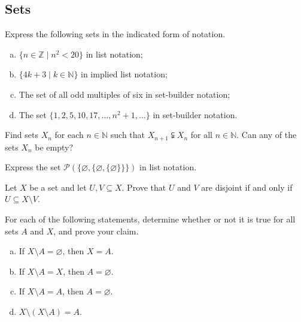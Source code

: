 \subsection*{Sets}

\begin{chapex}
Express the following sets in the indicated form of notation.
\begin{enumerate}[(a)]
\item $\{ n \in \mathbb{Z} \mid n^2 < 20 \}$ in list notation;
\item $\{ 4k+3 \mid k \in \mathbb{N} \}$ in implied list notation;
\item The set of all odd multiples of six in set-builder notation;
\item The set $\{ 1, 2, 5, 10, 17, \dots, n^2+1, \dots \}$ in set-builder notation.
\end{enumerate}
\end{chapex}

\begin{chapex}
Find sets $X_n$ for each $n \in \mathbb{N}$ such that $X_{n+1} \subsetneqq X_n$ for all $n \in \mathbb{N}$. Can any of the sets $X_n$ be empty?
\end{chapex}

\begin{chapex}
Express the set $\mathcal{P}(\{ \varnothing, \{ \varnothing, \{ \varnothing \} \} \})$ in list notation.
\end{chapex}

\begin{chapex}
Let $X$ be a set and let $U, V \subseteq X$. Prove that $U$ and $V$ are disjoint if and only if $U \subseteq X \setminus V$.
\end{chapex}

\begin{chapex}
For each of the following statements, determine whether or not it is true for all sets $A$ and $X$, and prove your claim.
\begin{multicols}{2}
\begin{enumerate}[(a)]
\item If $X \setminus A = \varnothing$, then $X = A$.
\item If $X \setminus A = X$, then $A = \varnothing$.
\item If $X \setminus A = A$, then $A = \varnothing$.
\item $X \setminus (X \setminus A) = A$.
\end{enumerate}
\end{multicols}
\end{chapex}

